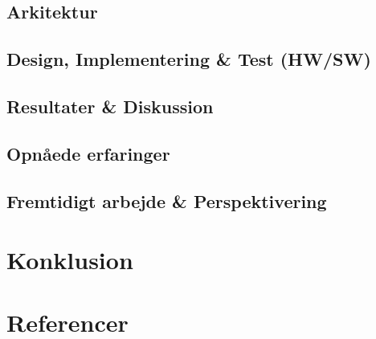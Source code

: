 \documentclass[11pt]{article}
\begin{document}
\subsection{Arkitektur}
\subsection{Design, Implementering \& Test (HW/SW)}
\subsection{Resultater \& Diskussion}
\subsection{Opnåede erfaringer}
\subsection{Fremtidigt arbejde \& Perspektivering}
\vfill
\pagebreak

\section{Konklusion}
\vfill
\pagebreak

\section{Referencer}
\vfill
\pagebreak
\end{document}
